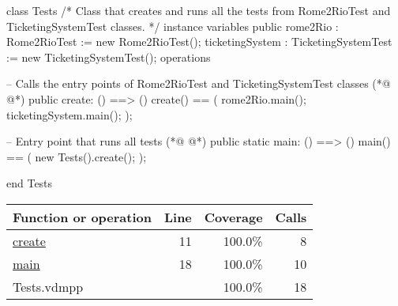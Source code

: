 \begin{vdmpp}[breaklines=true]
class Tests
/* 
  Class that creates and runs all the tests from Rome2RioTest and TicketingSystemTest classes.
*/
instance variables
 public rome2Rio : Rome2RioTest := new Rome2RioTest();
 ticketingSystem : TicketingSystemTest := new TicketingSystemTest();
operations

 -- Calls the entry points of Rome2RioTest and TicketingSystemTest classes
(*@
\label{create:11}
@*)
 public create: () ==> ()
 create() == (
  rome2Rio.main();
  ticketingSystem.main();
 );

 -- Entry point that runs all tests 
(*@
\label{main:18}
@*)
 public static main: () ==> ()
    main() == (
      new Tests().create();
   );
 
end Tests
\end{vdmpp}
\bigskip
\begin{longtable}{|l|r|r|r|}
\hline
Function or operation & Line & Coverage & Calls \\
\hline
\hline
\hyperref[create:11]{create} & 11&100.0\% & 8 \\
\hline
\hyperref[main:18]{main} & 18&100.0\% & 10 \\
\hline
\hline
Tests.vdmpp & & 100.0\% & 18 \\
\hline
\end{longtable}


